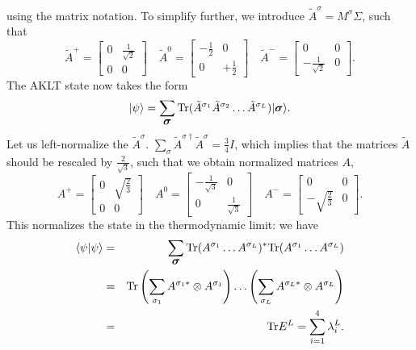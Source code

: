 \documentclass[a4paper,10pt,oneside,onecolumn,1p,times]{elsarticle}
\newcommand{\tr}{{\rm Tr }}
\newcommand{\ket}[1]{\mbox{$| #1  \rangle$}}
\newcommand{\braket}[2]{\mbox{$\langle #1  | #2 \rangle$}} 	%
\newcommand{\fat}[1]{\mbox{\boldmath$#1$\unboldmath}}	%
\newcommand{\syslength}{L}
\begin{document}
using the matrix notation. To simplify further, we introduce $\tilde{A}^\sigma= M^\sigma \Sigma$, such that
\begin{equation}
    \tilde{A}^+ = \left[ \begin{array}{cc} 0 & \frac{1}{\sqrt{2}} \\ 0 & 0 \end{array} \right] \quad
    \tilde{A}^0 = \left[ \begin{array}{cc} -\frac{1}{2} & 0 \\ 
    0 & +\frac{1}{2} \end{array} \right] \quad
    \tilde{A}^- = \left[ \begin{array}{cc} 0 & 0 \\ -\frac{1}{\sqrt{2}} & 0 \end{array} \right] .
    \label{eq:unnormalizeda}
\end{equation}
The AKLT state now takes the form 
\begin{equation}
    \ket{\psi} = \sum_{\fat{\sigma}} \tr (\tilde{A}^{\sigma_{1}} 
    \tilde{A}^{\sigma_{2}} \ldots \tilde{A}^{\sigma_{\syslength}}) \ket{\fat{\sigma}} .
    \label{eq:akltstate}
\end{equation}
Let us left-normalize the $\tilde{A}^\sigma$. $\sum_\sigma \tilde{A}^{\sigma\dagger}\tilde{A}^\sigma = \frac{3}{4}I$, which implies that the matrices $\tilde{A}$  should 
be rescaled by $\frac{2}{\sqrt{3}}$, such that we obtain normalized matrices $A$,
\begin{equation}
    A^+ = \left[ \begin{array}{cc} 0 & \sqrt{\frac{2}{3}} \\ 0 & 0 \end{array} \right] \quad
    A^0 = \left[ \begin{array}{cc} -\frac{1}{\sqrt{3}} & 0 \\ 
    0 & \frac{1}{\sqrt{3}} \end{array} \right] \quad
    A^- = \left[ \begin{array}{cc} 0 & 0 \\ -\sqrt{\frac{2}{3}} & 0 \end{array} \right] .
    \label{eq:normalizeda}
\end{equation}
This normalizes the state in the thermodynamic limit: we have
\begin{eqnarray*}
\braket{\psi}{\psi} &=& \sum_{\fat{\sigma}} \tr (A^{\sigma_1} \ldots A^{\sigma_\syslength})^* \tr (A^{\sigma_1} \ldots A^{\sigma_\syslength}) \\
&=&  \tr \left( \sum_{\sigma_1} A^{\sigma_1*} \otimes A^{\sigma_1}\right) \ldots \left( \sum_{\sigma_L} A^{\sigma_\syslength*}\otimes A^{\sigma_\syslength} \right) \\
&=& \tr E^L = \sum_{i=1}^4 \lambda_i^L .
\end{eqnarray*}
\end{document}
